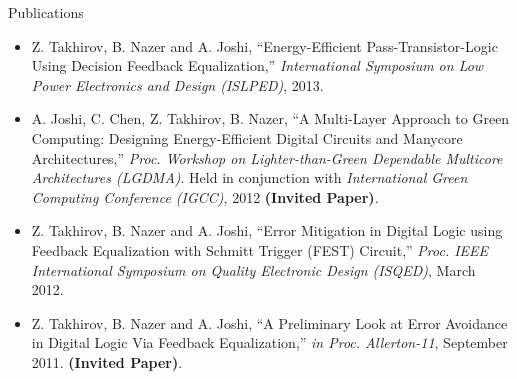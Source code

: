 \begin{rSection}{Publications}
	\begin{itemize}
		\item Z. Takhirov, B. Nazer and A. Joshi,  
			``Energy-Efficient Pass-Transistor-Logic Using Decision Feedback Equalization,'' 
			\emph{International Symposium on Low Power Electronics and Design (ISLPED)}, 2013.

		\item A. Joshi, C. Chen, Z. Takhirov, B. Nazer, 
			``A Multi-Layer Approach to Green Computing: Designing Energy-Efficient Digital Circuits and Manycore Architectures,'' 
			\emph{Proc. Workshop on Lighter-than-Green Dependable Multicore Architectures (LGDMA)}. 
			Held in conjunction with \emph{International Green Computing Conference (IGCC)}, 2012 
			\textbf{(Invited Paper)}.

		\item Z. Takhirov, B. Nazer and A. Joshi, 
			``Error Mitigation in Digital Logic using Feedback Equalization with Schmitt Trigger (FEST) Circuit,'' 
			\emph{Proc. IEEE International Symposium on Quality Electronic Design (ISQED)}, March 2012.

		\item Z. Takhirov, B. Nazer and A. Joshi, 
			``A Preliminary Look at Error Avoidance in Digital Logic Via Feedback Equalization,'' 
			\emph{in Proc. Allerton-11}, September 2011. 
			\textbf{(Invited Paper)}.
	\end{itemize}
\end{rSection}

